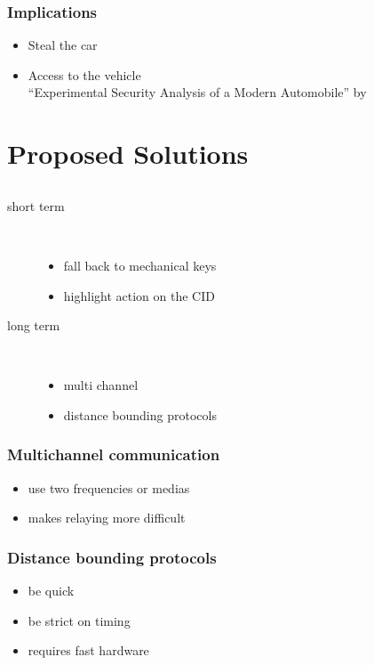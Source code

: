 \documentclass[12pt]{beamer}
\begin{document}
	\begin{frame}
		\frametitle{Implications}
			\begin{itemize}
				\item Steal the car
				\onslide<2-2>
				\item Access to the vehicle \\
				\textrightarrow ``Experimental Security Analysis of a Modern Automobile'' by	\citet{expModernAuto}
			\end{itemize}
	\end{frame}

\section{Proposed Solutions}
\subsection*{}
	\begin{frame}
		\frametitle{}
		\begin{description}
			\item[short term] \hfill \\
				\begin{itemize}
					\item fall back to mechanical keys 
					\item highlight action on the CID
				\end{itemize}
			\item[long term] \hfill \\
				\begin{itemize}
					\item	multi channel \citep{multichannelPrevRelay}
					\item distance bounding protocols \citep{distanceBoundingProtocols}
				\end{itemize}
		\end{description}
	\end{frame}

	\begin{frame}
		\frametitle{Multichannel communication}
			\begin{itemize}
				\item use two frequencies or medias
				\item makes relaying more difficult %
			\end{itemize}
	\end{frame}

	\begin{frame}
		\frametitle{Distance bounding protocols}
			\begin{itemize}
				\item be quick
				\item be strict on timing
				\item requires fast hardware
			\end{itemize}
	\end{frame}
\end{document}
